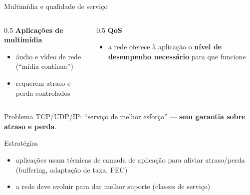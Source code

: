 \documentclass[aspectratio=169,11pt]{beamer}
\begin{document}
\begin{frame}{Multimídia e qualidade de serviço}
  \begin{columns}
    \begin{column}{0.5\textwidth}
      \textbf{Aplicações de multimídia}
      \begin{itemize}
        \item áudio e vídeo de rede (``mídia contínua'')
        \item requerem atraso e perda controlados
      \end{itemize}
    \end{column}
    \begin{column}{0.5\textwidth}
      \textbf{QoS}
      \begin{itemize}
        \item a rede oferece à aplicação o \textbf{nível de desempenho necessário} para que funcione
      \end{itemize}
    \end{column}
  \end{columns}
  \vspace{0.3cm}
  \pause
  \begin{alertblock}{Problema}
    TCP/UDP/IP: ``serviço de melhor esforço'' --- \textbf{sem garantia sobre atraso e perda}.
  \end{alertblock}
  \begin{block}{Estratégias}
    \begin{itemize}
      \item aplicações usam técnicas de camada de aplicação para aliviar atraso/perda (buffering, adaptação de taxa, FEC)
      \item a rede deve evoluir para dar melhor suporte (classes de serviço)
    \end{itemize}
  \end{block}
\end{frame}
\end{document}

